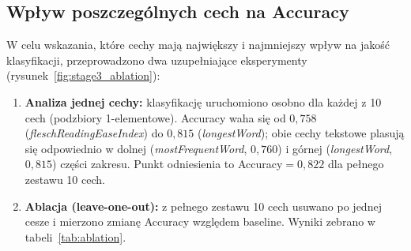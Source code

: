 \documentclass{article}
\begin{document}
\subsection{Wpływ poszczególnych cech na Accuracy}

W celu wskazania, które cechy mają największy i najmniejszy wpływ na jakość
klasyfikacji, przeprowadzono dwa uzupełniające eksperymenty
(rysunek~\ref{fig:stage3_ablation}):

\begin{enumerate}
    \item \textbf{Analiza jednej cechy:} klasyfikację uruchomiono osobno dla
    każdej z 10 cech (podzbiory 1-elementowe). Accuracy waha się od
    $0{,}758$ (\textit{fleschReadingEaseIndex}) do $0{,}815$
    (\textit{longestWord}); obie cechy tekstowe plasują się odpowiednio
    w dolnej (\textit{mostFrequentWord}, $0{,}760$) i górnej
    (\textit{longestWord}, $0{,}815$) części zakresu.
    Punkt odniesienia to Accuracy$=0{,}822$ dla pełnego zestawu 10 cech.

    \item \textbf{Ablacja (leave-one-out):} z pełnego zestawu 10 cech
    usuwano po jednej cesze i mierzono zmianę Accuracy względem baseline.
    Wyniki zebrano w tabeli~\ref{tab:ablation}.
\end{enumerate}
\end{document}
